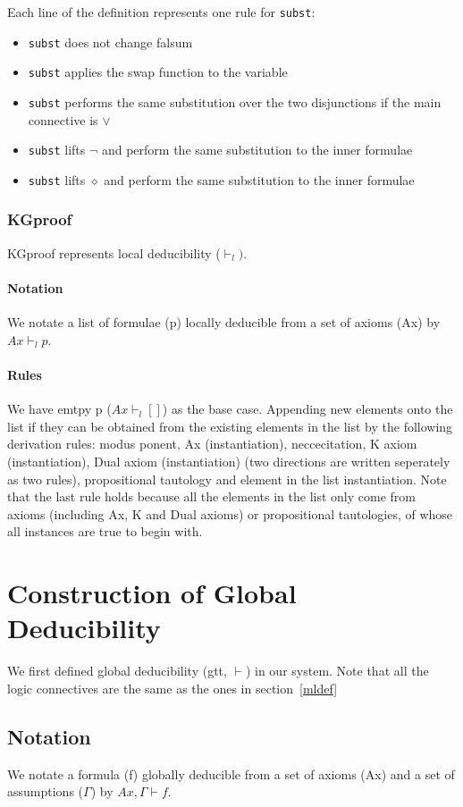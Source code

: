\documentclass[submission,copyright,creativecommons]{eptcs}
\begin{document}
Each line of the definition represents one rule for \texttt{subst}:
\begin{itemize}
\item \texttt{subst} does not change falsum 
\item \texttt{subst} applies the swap function to the variable
\item \texttt{subst} performs the same substitution over the two disjunctions 
if the main connective is $\vee$
\item \texttt{subst} lifts $\neg$ and perform the same substitution 
to the inner formulae
\item \texttt{subst} lifts $\diamond$ and perform the same substitution 
to the inner formulae
\end{itemize}

\subsubsection{KGproof}
KGproof represents local deducibility ($\vdash_l)$.
\paragraph{Notation} We notate a list of formulae (p) locally deducible 
from a set of axioms (Ax) by $Ax \vdash_l p$. 
\paragraph{Rules} We have emtpy p ($Ax \vdash_l []$) as the base case. 
Appending new elements onto the list if they can be obtained from the existing 
elements in the list by the following derivation rules: modus ponent, Ax (instantiation), 
neccecitation, K axiom (instantiation), Dual axiom (instantiation) (two directions are written seperately as 
two rules), propositional tautology and element in the list instantiation. 
Note that the last rule holds because all the elements in the list only 
come from axioms (including Ax, K and Dual axioms) or propositional tautologies, 
of whose all instances are true to begin with. 



\section{Construction of Global Deducibility}
We first defined global deducibility (gtt, $\vdash$) in our system.
Note that all the logic connectives are the same as the ones in section~\ref{mldef}
\subsection{Notation} 
We notate a formula (f) globally deducible from a set of axioms (Ax)
and a set of assumptions ($\Gamma$) by $Ax, \Gamma \vdash f$. 
\end{document}
